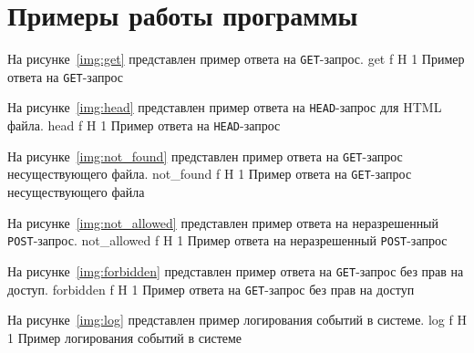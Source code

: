 \section{Примеры работы программы}

На рисунке~\ref{img:get} представлен пример ответа на \texttt{GET}-запрос.
	{get}
	{f}
	{H}
	{1\textwidth}
	{Пример ответа на \texttt{GET}-запрос}

\clearpage
На рисунке~\ref{img:head} представлен пример ответа на \texttt{HEAD}-запрос для HTML файла.
	{head}
	{f}
	{H}
	{1\textwidth}
	{Пример ответа на \texttt{HEAD}-запрос}

На рисунке~\ref{img:not_found} представлен пример ответа на \texttt{GET}-запрос несуществующего файла.
	{not_found}
	{f}
	{H}
	{1\textwidth}
	{Пример ответа на \texttt{GET}-запрос несуществующего файла}

На рисунке~\ref{img:not_allowed} представлен пример ответа на неразрешенный \texttt{POST}-запрос.
	{not_allowed}
	{f}
	{H}
	{1\textwidth}
	{Пример ответа на неразрешенный \texttt{POST}-запрос}

\clearpage
На рисунке~\ref{img:forbidden} представлен пример ответа на \texttt{GET}-запрос без прав на доступ.
	{forbidden}
	{f}
	{H}
	{1\textwidth}
	{Пример ответа на \texttt{GET}-запрос без прав на доступ}

На рисунке~\ref{img:log} представлен пример логирования событий в системе.
	{log}
	{f}
	{H}
	{1\textwidth}
	{Пример логирования событий в системе}